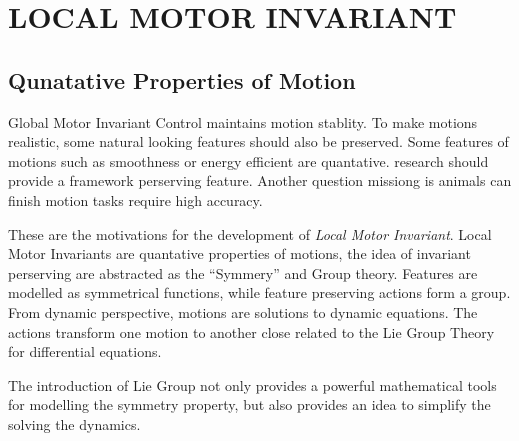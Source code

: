 \chapter{LOCAL MOTOR INVARIANT}
\label{chap:li}

\graphicspath{{LocalInvariant/LocalInvariantFigs/EPS/}{LocalInvariant/LocalInvariantFigs/}}


\section{Qunatative Properties of Motion}
Global Motor Invariant Control maintains motion stablity.
To make motions realistic, some natural looking features should also be preserved.
Some features of motions such as smoothness or energy efficient are quantative.
\cms research should provide a framework perserving feature.
Another question missiong is animals can finish motion tasks require high accuracy.

These are the motivations for the development of \emph{Local Motor Invariant}.
Local Motor Invariants are quantative properties of motions, the idea of invariant perserving are abstracted as the ``Symmery'' and Group theory.
Features are modelled as symmetrical functions, while feature preserving actions form a group.
From dynamic perspective, motions are solutions to dynamic equations.
The actions transform one motion to another close related to the Lie Group Theory for differential equations\citep{olver1986applications}.

The introduction of Lie Group not only provides a powerful mathematical tools for modelling the symmetry property, but also provides an idea to simplify the solving the dynamics.

